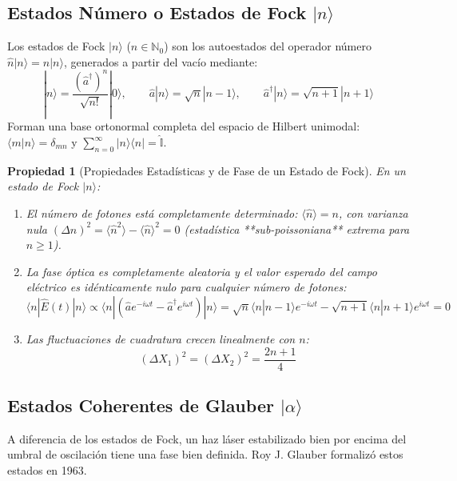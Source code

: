 \documentclass[11pt,a4paper]{book}
\newtheorem{propiedad}{Propiedad}[chapter]
\begin{document}
\subsection{Estados Número o Estados de Fock $|n\rangle$}

Los estados de Fock $|n\rangle$ ($n \in \mathbb{N}_0$) son los autoestados del operador número $\hat{n}|n\rangle = n|n\rangle$, generados a partir del vacío mediante:
\begin{equation}
|n\rangle = \frac{(\hat{a}^\dagger)^n}{\sqrt{n!}} |0\rangle, \qquad \hat{a}|n\rangle = \sqrt{n}|n-1\rangle, \qquad \hat{a}^\dagger|n\rangle = \sqrt{n+1}|n+1\rangle
\end{equation}
Forman una base ortonormal completa del espacio de Hilbert unimodal: $\langle m|n\rangle = \delta_{mn}$ y $\sum_{n=0}^\infty |n\rangle\langle n| = \hat{\mathbb{I}}$.

\begin{propiedad}[Propiedades Estadísticas y de Fase de un Estado de Fock]
En un estado de Fock $|n\rangle$:
\begin{enumerate}
    \item El número de fotones está completamente determinado: $\langle \hat{n} \rangle = n$, con varianza nula $(\Delta n)^2 = \langle \hat{n}^2 \rangle - \langle \hat{n} \rangle^2 = 0$ (estadística **sub-poissoniana** extrema para $n \geq 1$).
    \item La fase óptica es completamente aleatoria y el valor esperado del campo eléctrico es idénticamente nulo para cualquier número de fotones:
    \[
    \langle n | \hat{E}(t) | n \rangle \propto \langle n | (\hat{a}e^{-i\omega t} - \hat{a}^\dagger e^{i\omega t}) | n \rangle = \sqrt{n}\langle n|n-1\rangle e^{-i\omega t} - \sqrt{n+1}\langle n|n+1\rangle e^{i\omega t} = 0
    \]
    \item Las fluctuaciones de cuadratura crecen linealmente con $n$:
    \[
    (\Delta X_1)^2 = (\Delta X_2)^2 = \frac{2n + 1}{4}
    \]
\end{enumerate}
\end{propiedad}

\subsection[Estados coherentes de Glauber]{Estados Coherentes de Glauber $|\alpha\rangle$}

A diferencia de los estados de Fock, un haz láser estabilizado bien por encima del umbral de oscilación tiene una fase bien definida. Roy J. Glauber formalizó estos estados en 1963.
\end{document}
